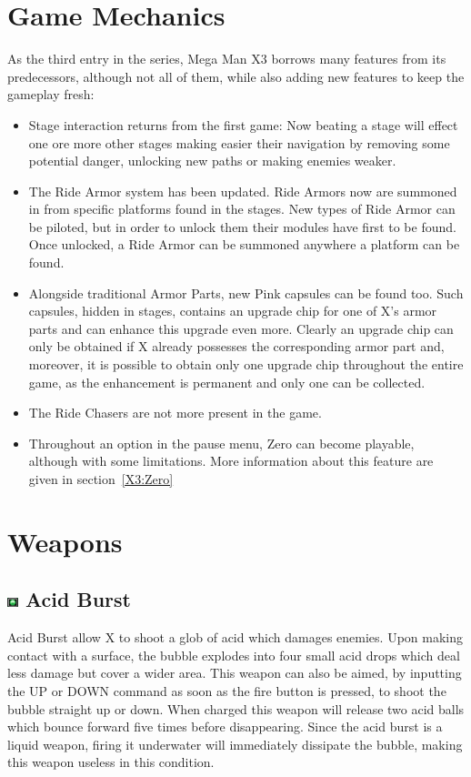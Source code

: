 \section{Game Mechanics}
As the third entry in the series, Mega Man X3 borrows many features from its predecessors, although not all of them, while also adding new features to keep the gameplay fresh:
\begin{itemize}
	\item Stage interaction returns from the first game: Now beating a stage will effect one ore more other stages making easier their navigation by removing some potential danger, unlocking new paths or making enemies weaker.
	\item The Ride Armor system has been updated. Ride Armors now are summoned in from specific platforms found in the stages. New types of Ride Armor can be piloted, but in order to unlock them their modules have first to be found. Once unlocked, a Ride Armor can be summoned anywhere a platform can be found.
	\item Alongside traditional Armor Parts, new Pink capsules can be found too. Such capsules, hidden in stages, contains an upgrade chip for one of X's armor parts and can enhance this upgrade even more. Clearly an upgrade chip can only be obtained if X already possesses the corresponding armor part and, moreover, it is possible to obtain only one upgrade chip throughout the entire game, as the enhancement is permanent and only one can be collected.
	\item The Ride Chasers are not more present in the game.
	\item Throughout an option in the pause menu, Zero can become playable, although with some limitations. More information about this feature are given in section~\ref{X3:Zero}
\end{itemize}
\section{Weapons}\label{X3:sub_weapon}
\subsection{\includegraphics[width=12px, height=10px]{figures/X3/weapons/A_burst.jpg} Acid Burst}\label{Acid_Burst}
Acid Burst allow X to shoot a glob of acid which damages enemies. Upon making contact with a surface, the bubble explodes into four small acid drops which deal less damage but cover a wider area. This weapon can also be aimed, by inputting the UP or DOWN command as soon as the fire button is pressed, to shoot the bubble straight up or down. When charged this weapon will release two acid balls which bounce forward five times before disappearing. Since the acid burst is a liquid weapon, firing it underwater will immediately dissipate the bubble, making this weapon useless in this condition. 

